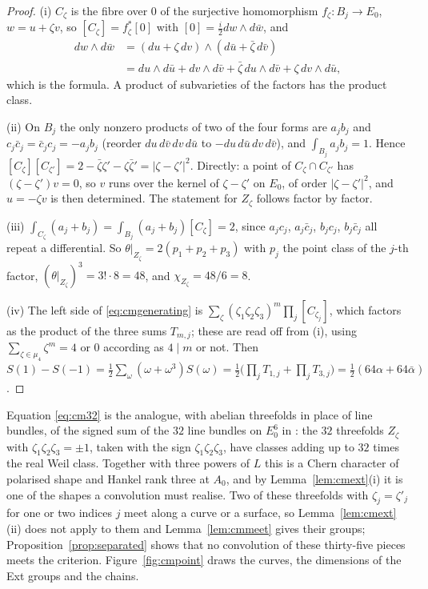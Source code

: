 \begin{proof}
(i) $C_{\zeta}$ is the fibre over $0$ of the surjective homomorphism $f_{\zeta}\colon B_{j}\to E_{0}$, $w=u+\zeta v$, so $[C_{\zeta}]=f_{\zeta}^{*}[0]$ with $[0]=\tfrac{i}{2}dw\wedge d\bar w$, and
\begin{align*}
dw\wedge d\bar w&=(du+\zeta\,dv)\wedge(d\bar u+\bar\zeta\,d\bar v)\\
&=du\wedge d\bar u+dv\wedge d\bar v+\bar\zeta\,du\wedge d\bar v+\zeta\,dv\wedge d\bar u ,
\end{align*}
which is the formula. A product of subvarieties of the factors has the product class.

(ii) On $B_{j}$ the only nonzero products of two of the four forms are $a_{j}b_{j}$ and $c_{j}\bar c_{j}=\bar c_{j}c_{j}=-a_{j}b_{j}$ (reorder $du\,d\bar v\,dv\,d\bar u$ to $-du\,d\bar u\,dv\,d\bar v$), and $\int_{B_{j}}a_{j}b_{j}=1$. Hence $[C_{\zeta}][C_{\zeta'}]=2-\bar\zeta\zeta'-\zeta\bar\zeta'=|\zeta-\zeta'|^{2}$. Directly: a point of $C_{\zeta}\cap C_{\zeta'}$ has $(\zeta-\zeta')v=0$, so $v$ runs over the kernel of $\zeta-\zeta'$ on $E_{0}$, of order $|\zeta-\zeta'|^{2}$, and $u=-\zeta v$ is then determined. The statement for $Z_{\zeta}$ follows factor by factor.

(iii) $\int_{C_{\zeta}}(a_{j}+b_{j})=\int_{B_{j}}(a_{j}+b_{j})[C_{\zeta}]=2$, since $a_{j}c_{j}$, $a_{j}\bar c_{j}$, $b_{j}c_{j}$, $b_{j}\bar c_{j}$ all repeat a differential. So $\theta|_{Z_{\zeta}}=2(p_{1}+p_{2}+p_{3})$ with $p_{j}$ the point class of the $j$-th factor, $(\theta|_{Z_{\zeta}})^{3}=3!\cdot8=48$, and $\chi_{Z_{\zeta}}=48/6=8$.

(iv) The left side of \eqref{eq:cmgenerating} is $\sum_{\zeta}(\zeta_{1}\zeta_{2}\zeta_{3})^{m}\prod_{j}[C_{\zeta_{j}}]$, which factors as the product of the three sums $T_{m,j}$; these are read off from (i), using $\sum_{\zeta\in\mu_{4}}\zeta^{m}=4$ or $0$ according as $4\mid m$ or not. Then $S(1)-S(-1)=\tfrac12\sum_{\omega}(\omega+\omega^{3})S(\omega)=\tfrac12\bigl(\prod_{j}T_{1,j}+\prod_{j}T_{3,j}\bigr)=\tfrac12(64\alpha+64\bar\alpha)$.
\end{proof}

Equation \eqref{eq:cm32} is the analogue, with abelian threefolds in place of line bundles, of the signed sum of the $32$ line bundles on $E_{0}^{6}$ in \cite[Prop.~18.21]{BMB26}: the $32$ threefolds $Z_{\zeta}$ with $\zeta_{1}\zeta_{2}\zeta_{3}=\pm1$, taken with the sign $\zeta_{1}\zeta_{2}\zeta_{3}$, have classes adding up to $32$ times the real Weil class. Together with three powers of $L$ this is a Chern character of polarised shape and Hankel rank three at $A_{0}$, and by Lemma~\ref{lem:cmext}(i) it is one of the shapes a convolution must realise. Two of these threefolds with $\zeta_{j}=\zeta'_{j}$ for one or two indices $j$ meet along a curve or a surface, so Lemma~\ref{lem:cmext}(ii) does not apply to them and Lemma~\ref{lem:cmmeet} gives their groups; Proposition~\ref{prop:separated} shows that no convolution of these thirty-five pieces meets the criterion. Figure~\ref{fig:cmpoint} draws the curves, the dimensions of the Ext groups and the chains.

